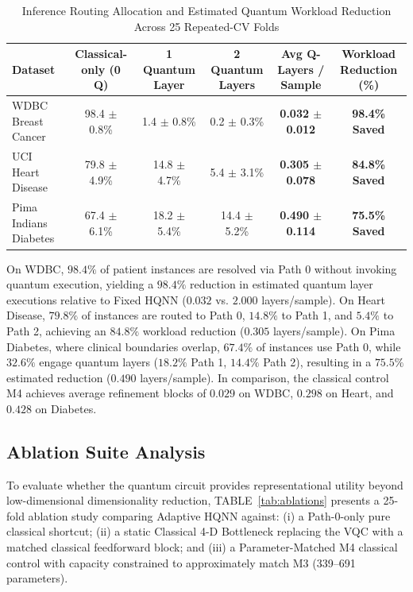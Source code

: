 \documentclass[conference]{IEEEtran}
\begin{document}
\begin{table}[htbp]
\caption{Inference Routing Allocation and Estimated Quantum Workload Reduction Across 25 Repeated-CV Folds}
\label{tab:efficiency}
\centering
\begin{tabular}{lccccc}
\toprule
Dataset & Classical-only (0 Q) & 1 Quantum Layer & 2 Quantum Layers & Avg Q-Layers / Sample & Workload Reduction (\%) \\
\midrule
WDBC Breast Cancer & 98.4 $\pm$ 0.8\% & 1.4 $\pm$ 0.8\% & 0.2 $\pm$ 0.3\% & \textbf{0.032 $\pm$ 0.012} & \textbf{98.4\% Saved} \\
UCI Heart Disease & 79.8 $\pm$ 4.9\% & 14.8 $\pm$ 4.7\% & 5.4 $\pm$ 3.1\% & \textbf{0.305 $\pm$ 0.078} & \textbf{84.8\% Saved} \\
Pima Indians Diabetes & 67.4 $\pm$ 6.1\% & 18.2 $\pm$ 5.4\% & 14.4 $\pm$ 5.2\% & \textbf{0.490 $\pm$ 0.114} & \textbf{75.5\% Saved} \\
\bottomrule
\end{tabular}
\end{table}

On WDBC, $98.4\%$ of patient instances are resolved via Path 0 without invoking quantum execution, yielding a $98.4\%$ reduction in estimated quantum layer executions relative to Fixed HQNN ($0.032$ vs. $2.000$ layers/sample). On Heart Disease, $79.8\%$ of instances are routed to Path 0, $14.8\%$ to Path 1, and $5.4\%$ to Path 2, achieving an $84.8\%$ workload reduction ($0.305$ layers/sample). On Pima Diabetes, where clinical boundaries overlap, $67.4\%$ of instances use Path 0, while $32.6\%$ engage quantum layers ($18.2\%$ Path 1, $14.4\%$ Path 2), resulting in a $75.5\%$ estimated reduction ($0.490$ layers/sample). In comparison, the classical control M4 achieves average refinement blocks of $0.029$ on WDBC, $0.298$ on Heart, and $0.428$ on Diabetes.

\subsection{Ablation Suite Analysis}
To evaluate whether the quantum circuit provides representational utility beyond low-dimensional dimensionality reduction, TABLE~\ref{tab:ablations} presents a 25-fold ablation study comparing Adaptive HQNN against: (i) a Path-0-only pure classical shortcut; (ii) a static Classical 4-D Bottleneck replacing the VQC with a matched classical feedforward block; and (iii) a Parameter-Matched M4 classical control with capacity constrained to approximately match M3 (339--691 parameters).
\end{document}
